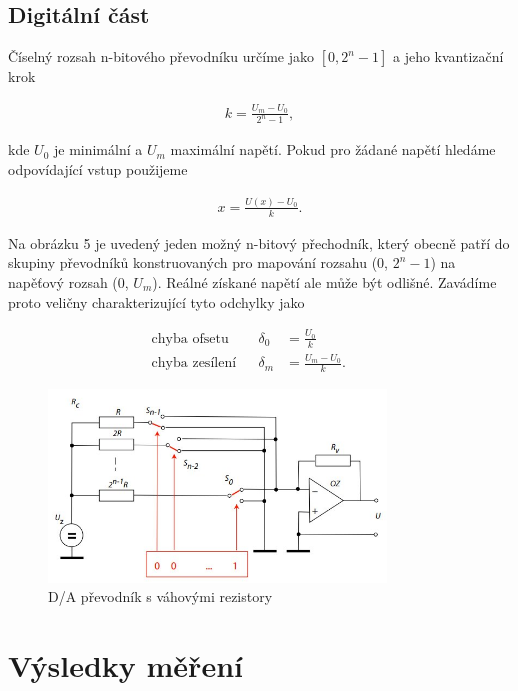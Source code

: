 \documentclass[a4paper,11pt]{article}
\begin{document}
\subsection{Digitální část}

Číselný rozsah n-bitového převodníku určíme jako $[0, 2^n -1]$ a jeho kvantizační krok 

\begin{align}
  k = \frac{U_m - U_0}{2^n -1},
\end{align}

\noindent
kde $U_0$ je minimální a $U_m$ maximální napětí. Pokud pro žádané napětí hledáme odpovídající vstup použijeme

\begin{align}
  x = \frac{U(x) - U_0}{k}.
\end{align}

Na obrázku 5 je uvedený jeden možný n-bitový přechodník, který obecně patří do skupiny převodníků konstruovaných pro mapování rozsahu (0, $2^n -1$) na napěťový rozsah (0, $U_m$). Reálné získané napětí ale může být odlišné. Zavádíme proto veličny charakterizující tyto odchylky jako

\begin{align}
  \text{chyba ofsetu} & & \delta_0 &= \frac{U_0}{k} & &\\
  \text{chyba zesílení} & & \delta_m &= \frac{U_m - U_0}{k}.
\end{align}

\begin{figure}[htpb]
  \centering
  \includegraphics[width=0.8\textwidth]{da_prevodnik.jpg}
  \caption{D/A převodník s váhovými rezistory}
\end{figure}

\newpage

\section{Výsledky měření}
\end{document}
